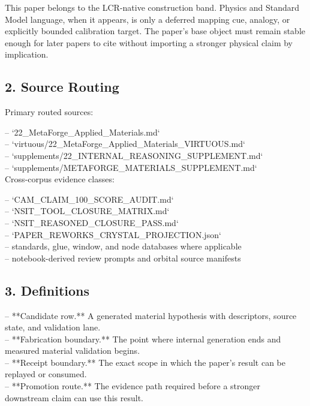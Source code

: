 \documentclass[11pt]{article}
\begin{document}
This paper belongs to the LCR-native construction band. Physics and Standard Model language, when it appears, is only a deferred mapping cue, analogy, or explicitly bounded calibration target. The paper's base object must remain stable enough for later papers to cite without importing a stronger physical claim by implication.

\subsection*{2. Source Routing}

Primary routed sources:

\noindent{}-- `22\_MetaForge\_Applied\_Materials.md`\\
\noindent{}-- `virtuous/22\_MetaForge\_Applied\_Materials\_VIRTUOUS.md`\\
\noindent{}-- `supplements/22\_INTERNAL\_REASONING\_SUPPLEMENT.md`\\
\noindent{}-- `supplements/METAFORGE\_MATERIALS\_SUPPLEMENT.md`\\

Cross-corpus evidence classes:

\noindent{}-- `CAM\_CLAIM\_100\_SCORE\_AUDIT.md`\\
\noindent{}-- `NSIT\_TOOL\_CLOSURE\_MATRIX.md`\\
\noindent{}-- `NSIT\_REASONED\_CLOSURE\_PASS.md`\\
\noindent{}-- `PAPER\_REWORKS\_CRYSTAL\_PROJECTION.json`\\
\noindent{}-- standards, glue, window, and node databases where applicable\\
\noindent{}-- notebook-derived review prompts and orbital source manifests\\

\subsection*{3. Definitions}

\noindent{}-- **Candidate row.** A generated material hypothesis with descriptors, source state, and validation lane.\\
\noindent{}-- **Fabrication boundary.** The point where internal generation ends and measured material validation begins.\\
\noindent{}-- **Receipt boundary.** The exact scope in which the paper's result can be replayed or consumed.\\
\noindent{}-- **Promotion route.** The evidence path required before a stronger downstream claim can use this result.\\
\end{document}
